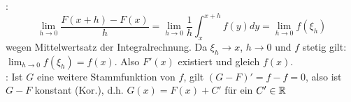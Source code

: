 \Bew {}:
$$\lim_{h\to 0} \frac{F(x + h) - F(x)}{h} = \lim_{h\to 0} \frac{1}{h} \int_{x}^{x + h} f(y) dy = \lim_{h\to 0} f(\xi_h)$$
wegen Mittelwertsatz der Integralrechnung. Da $\xi_h \to x$, $h \to 0$ und $f$ stetig gilt:
$\lim_{h\to 0} f(\xi_h) = f(x)$. Also $F'(x)$ existiert und gleich $f(x)$. \\
: Ist $G$ eine weitere Stammfunktion von $f$, gilt $(G - F)' = f - f = 0$,
also ist $G - F$ konstant (Kor.), d.h. $G(x) = F(x) + C'$ für ein $C' \in \mathbb{R}$

